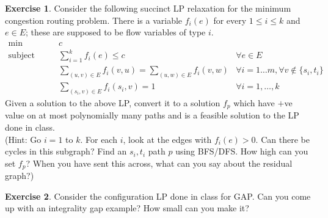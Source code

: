 \documentclass[11pt]{article}
\theoremstyle{definition}
\newtheorem{exercise}{Exercise}
\begin{document}
\begin{exercise}
Consider the following succinct LP relaxation for the minimum congestion routing problem. There is a variable $f_i(e)$ for every $1\leq i\leq k$ and $e\in E$; these are supposed to be flow variables
of type $i$.
\begin{align*}
\min &\qquad c & \\
\textrm{subject to} 	&\qquad \sum_{i=1}^k  f_i(e) \leq c & \forall e \in E \\
				&\qquad \sum_{(u,v)\in E} f_i(v,u) = \sum_{(u,w)\in E} f_i(v,w) & \forall i=1\ldots m, \forall v\notin\{s_i,t_i\}				\\
				& \qquad \sum_{(s_i,v)\in E} f_i(s_i,v) = 1 & \forall i=1,\ldots,k
\end{align*}
Given a solution to the above LP, convert it to a solution $f_p$ which have $+$ve value on at most polynomially many paths and 
is a feasible solution to the LP done in class. \\
(Hint: Go $i=1$ to $k$. For each $i$, look at the edges with $f_i(e) > 0$. Can there be cycles in this subgraph? Find an $s_i,t_i$ path $p$ using BFS/DFS. How high can you set $f_p$?
When you have sent this across, what can you say about the residual graph?)
\end{exercise}
\vspace{1ex}

\begin{exercise}
Consider the configuration LP done in class for GAP. Can you come up with an integrality gap example? How small can you make it?
\end{exercise}
\end{document}
